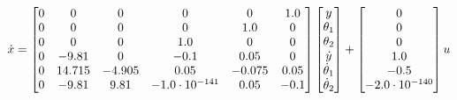 \begin{equation}
 \dot x = \left[\begin{matrix}0 & 0 & 0 & 0 & 0 & 1.0\\0 & 0 & 0 & 0 & 1.0 & 0\\0 & 0 & 0 & 1.0 & 0 & 0\\0 & -9.81 & 0 & -0.1 & 0.05 & 0\\0 & 14.715 & -4.905 & 0.05 & -0.075 & 0.05\\0 & -9.81 & 9.81 & -1.0 \cdot 10^{-141} & 0.05 & -0.1\end{matrix}\right]\left[\begin{matrix}y\\\theta_{1}\\\theta_{2}\\\dot y\\\dot\theta_{1}\\\dot\theta_{2}\end{matrix}\right] + \left[\begin{matrix}0\\0\\0\\1.0\\-0.5\\-2.0 \cdot 10^{-140}\end{matrix}\right]u
\end{equation}

